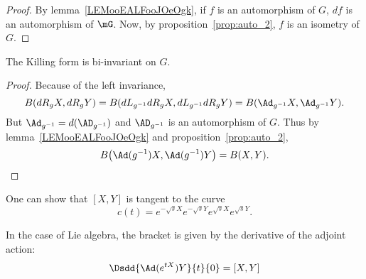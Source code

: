 \begin{proof}
    By lemma~\ref{LEMooEALFooJOeOgk}, if $f$ is an automorphism of $G$, $df$ is an automorphism of $\mG$. Now, by proposition~\ref{prop:auto_2}, $f$ is an isometry of $G$.
\end{proof}

\begin{theorem}
The Killing form is bi-invariant on $G$.
\label{tho:bi_invariance}
\end{theorem}

\begin{proof}
Because of the left invariance,
\[
  B(dR_gX,dR_gY)=B(dL_{g^{-1}}dR_gX,dL_{g^{-1}}dR_gY)=B(\Ad_{g^{-1}}X,\Ad_{g^{-1}}Y).
\]
But $\Ad_{g^{-1}}=d(\AD_{g^{-1}})$ and $\AD_{g^{-1}}$ is an automorphism of $G$. Thus by lemma~\ref{LEMooEALFooJOeOgk} and proposition~\ref{prop:auto_2},
\begin{equation}                    \label{eq_KillAdinvariant}
B\big(\Ad(g^{-1})X,\Ad(g^{-1})Y\big)=B(X,Y).
\end{equation}

\end{proof}

One can show that $[X,Y]$ is tangent to the curve
\begin{equation}
  c(t)=e^{-\sqrt{s}X}e^{-\sqrt{s}Y}e^{\sqrt{s}X}e^{\sqrt{s}Y}.
\end{equation}

\begin{lemma}
	In the case of Lie algebra, the bracket is given by the derivative of the adjoint action:
	\begin{equation}
		\Dsdd{ \Ad( e^{tX})Y }{t}{0}=[X,Y]
	\end{equation}
\end{lemma}

